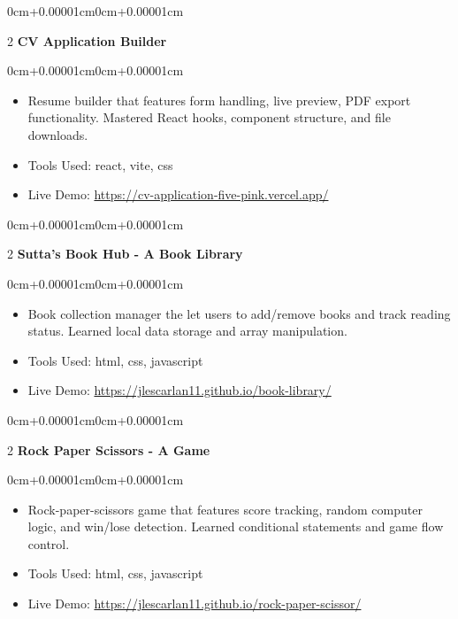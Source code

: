 \documentclass[10pt, letterpaper]{article}
\newenvironment{highlights}{\begin{itemize}[topsep=0.10cm,parsep=0.10cm,partopsep=0pt,itemsep=0pt,leftmargin=0cm+10pt]}{\end{itemize}}
\newenvironment{onecolentry}{\begin{adjustwidth}{0cm+0.00001cm}{0cm+0.00001cm}}{\end{adjustwidth}}
\newenvironment{twocolentry}[2][]{\onecolentry\def\secondColumn{#2}\setcolumnwidth{\fill,8cm}\begin{paracol}{2}}{\switchcolumn \raggedleft \secondColumn\end{paracol}\endonecolentry}
\begin{document}
    \begin{twocolentry}{2025}
      \textbf{CV Application Builder}\end{twocolentry}
    \vspace{0.10cm}
    \begin{onecolentry}
      \begin{highlights}
        \item Resume builder that features form handling, live preview, PDF export functionality. Mastered React hooks, component structure, and file downloads.
        \item Tools Used: react, vite, css
        \item Live Demo: \href{https://cv-application-five-pink.vercel.app/}{https://cv-application-five-pink.vercel.app/}
      \end{highlights}
    \end{onecolentry}
    \vspace{0.15cm}
  

    \begin{twocolentry}{2025}
      \textbf{Sutta's Book Hub - A Book Library}\end{twocolentry}
    \vspace{0.10cm}
    \begin{onecolentry}
      \begin{highlights}
        \item Book collection manager the let users to add/remove books and track reading status. Learned local data storage and array manipulation.
        \item Tools Used: html, css, javascript
        \item Live Demo: \href{https://jlescarlan11.github.io/book-library/}{https://jlescarlan11.github.io/book-library/}
      \end{highlights}
    \end{onecolentry}
    \vspace{0.15cm}
  

    \begin{twocolentry}{2025}
      \textbf{Rock Paper Scissors - A Game}\end{twocolentry}
    \vspace{0.10cm}
    \begin{onecolentry}
      \begin{highlights}
        \item Rock-paper-scissors game that features score tracking, random computer logic, and win/lose detection. Learned conditional statements and game flow control.
        \item Tools Used: html, css, javascript
        \item Live Demo: \href{https://jlescarlan11.github.io/rock-paper-scissor/}{https://jlescarlan11.github.io/rock-paper-scissor/}
      \end{highlights}
    \end{onecolentry}
    \vspace{0.15cm}
  
\end{document}
